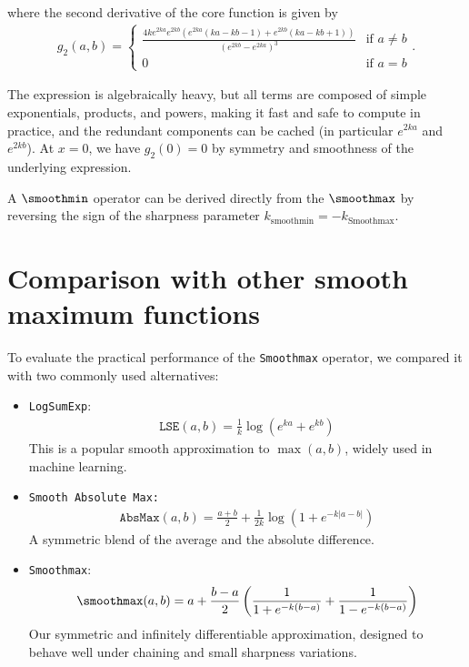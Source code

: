 where the second derivative of the core function is given by
\begin{align}
    g_2(a, b) = \begin{cases}
        \frac{4ke^{2ka}e^{2kb} \left( e^{2ka} (ka-kb-1) + e^{2kb}(ka - kb + 1) \right)}{\left(e^{2kb}-e^{2ka} \right)^3} &\text{if } a \neq b \\
        0  &\text{if } a = b
    \end{cases}.
\end{align}

The expression is algebraically heavy, but all terms are composed of simple exponentials, products, and powers, making it fast and safe to compute in practice, and the redundant components can be cached (in particular $e^{2ka}$ and $e^{2kb}$). At $x = 0$, we have $g_2(0) = 0$ by symmetry and smoothness of the underlying expression.

A $\smoothmin$ operator can be derived directly from the $\smoothmax$ by reversing the sign of the sharpness parameter $k_{\text{smoothmin}} = - k_{\text{Smoothmax}}$.



\section{Comparison with other smooth maximum functions}
\label{sec:comparison-smoothmax}

To evaluate the practical performance of the \texttt{Smoothmax} operator, we compared it with two commonly used alternatives:

\begin{itemize}
    \item \texttt{LogSumExp}:
    \begin{align}
        \mathrm{\texttt{LSE}}(a, b) = \frac{1}{k} \log\left(e^{k a} + e^{k b}\right)
    \end{align}
    This is a popular smooth approximation to $\max(a, b)$, widely used in machine learning.

    \item \texttt{Smooth Absolute Max:}
    \begin{align}
        \mathrm{\texttt{AbsMax}}(a, b) = \frac{a + b}{2} + \frac{1}{2k} \log\left(1 + e^{-k|a - b|}\right)
    \end{align}
    A symmetric blend of the average and the absolute difference.

    \item \texttt{Smoothmax}:
    \begin{align}
        \smoothmax(a, b) = a + \frac{b - a}{2} \left( \frac{1}{1 + e^{-k(b - a)}} + \frac{1}{1 - e^{-k(b - a)}} \right)
    \end{align}
    Our symmetric and infinitely differentiable approximation, designed to behave well under chaining and small sharpness variations.
\end{itemize}

